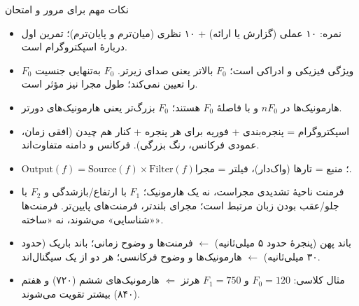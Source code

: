 \begin{exambox}{نکات مهم برای مرور و امتحان}
\begin{itemize}
  \item نمره: ۱۰ عملی (گزارش یا ارائه) + ۱۰ نظری (میان‌ترم و پایان‌ترم)؛ تمرین اول دربارهٔ اسپکتروگرام است.
  \item $F_0$ ویژگی فیزیکی و  ادراکی است؛ $F_0$ بالاتر یعنی صدای زیرتر. $F_0$ به‌تنهایی جنسیت را تعیین نمی‌کند؛ طول مجرا نیز مؤثر است.
  \item هارمونیک‌ها در $nF_0$ و با فاصلهٔ $F_0$ هستند؛ $F_0$ بزرگ‌تر یعنی هارمونیک‌های دورتر.
  \item اسپکتروگرام = پنجره‌بندی + فوریه برای هر پنجره + کنار هم چیدن (افقی زمان، عمودی فرکانس، رنگ بزرگی). فرکانس و دامنه متفاوت‌اند.
  \item $\text{Output}(f)=\text{Source}(f)\times\text{Filter}(f)$؛ منبع = تارها (واک‌دار)، فیلتر = مجرا.
  \item فرمنت ناحیهٔ تشدیدی مجراست، نه یک هارمونیک؛ $F_1$ با ارتفاع/بازشدگی و $F_2$ با جلو/عقب بودن زبان مرتبط است؛ مجرای بلندتر، فرمنت‌های پایین‌تر. فرمنت‌ها «شناسایی» می‌شوند، نه «ساخته».
  \item باند پهن (پنجرهٔ حدود ۵ میلی‌ثانیه) $\leftarrow$ فرمنت‌ها و وضوح زمانی؛ باند باریک (حدود ۳۰ میلی‌ثانیه) $\leftarrow$ هارمونیک‌ها و وضوح فرکانسی؛ هر دو از یک سیگنال‌اند.
  \item مثال کلاسی: $F_0=120$ و $F_1=750$ هرتز $\Leftarrow$ هارمونیک‌های ششم (۷۲۰) و هفتم (۸۴۰) بیشتر تقویت می‌شوند.
\end{itemize}
\end{exambox}
